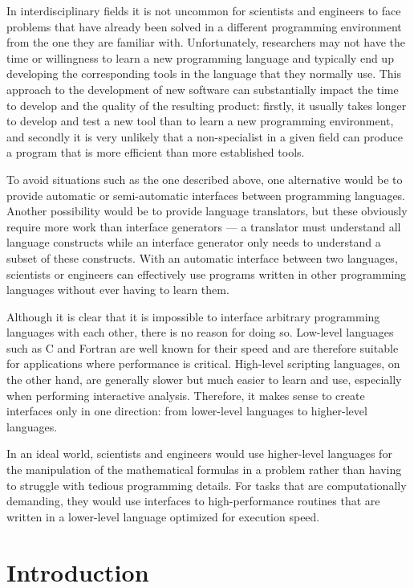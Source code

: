 \documentclass[twocolumn]{article}
\begin{document}
In interdisciplinary fields it is not uncommon for scientists and
engineers to face problems that have already been solved in a
different programming environment from the one they are familiar with.
Unfortunately, researchers may not have the time or willingness to
learn a new programming language and typically end up developing the
corresponding tools in the language that they normally use.  This
approach to the development of new software can substantially impact
the time to develop and the quality of the resulting product: firstly,
it usually takes longer to develop and test a new tool than to learn a
new programming environment, and secondly it is very unlikely that a
non-specialist in a given field can produce a program that is more
efficient than more established tools.

To avoid situations such as the one described above, one alternative
would be to provide automatic or semi-automatic interfaces between programming
languages. Another possibility would be to provide language
translators, but these obviously require more work than interface
generators --- a translator must understand all language constructs
while an interface generator only needs to understand a subset of these
constructs.  With an automatic interface between two languages, scientists or
engineers can effectively use programs written in other programming
languages without ever having to learn them.

Although it is clear that it is impossible to interface arbitrary programming
languages with each other, there is no reason for doing so.  Low-level languages such as C and Fortran are well known for
their speed and are therefore suitable for applications where
performance is critical.  High-level scripting languages, on the other
hand, are generally slower but much easier to learn and use,
especially when performing interactive analysis.  Therefore, it makes
sense to create interfaces only in one direction: from lower-level
languages to higher-level languages.

In an ideal world, scientists and engineers would use higher-level
languages for the manipulation of the mathematical formulas in a problem
rather than having to struggle with tedious programming details.  For tasks
that are computationally demanding, they would use interfaces to
high-performance routines that are written in a lower-level language
optimized for execution speed.


\section{Introduction}
\label{sec:intro}
\end{document}
